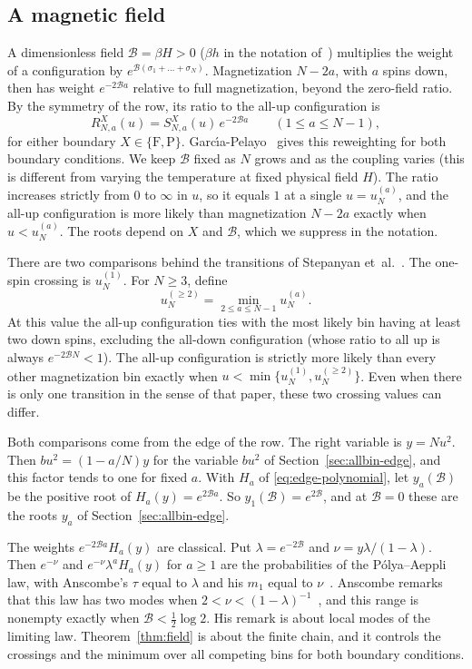 \subsection{A magnetic field}\label{sec:field}

A dimensionless field $\mathcal B=\beta H>0$ ($\beta h$ in the notation
of~\cite{stepanyan2024}) multiplies the weight of a
configuration by $e^{\mathcal B(\sigma_1+\dots+\sigma_N)}$. Magnetization
$N-2a$, with $a$ spins down, then has weight $e^{-2\mathcal Ba}$ relative to
full magnetization, beyond the zero-field ratio. By the symmetry of the row, its
ratio to the all-up configuration is
\[
R^X_{N,a}(u)=S^X_{N,a}(u)\,e^{-2\mathcal Ba}\qquad(1\le a\le N-1),
\]
for either boundary $X\in\{\mathrm F,\mathrm P\}$. Garc\'{\i}a-Pelayo~\cite[Eq.~(17)]{garciapelayo2009}
gives this reweighting for both boundary conditions. We keep $\mathcal B$ fixed
as $N$ grows and as the coupling varies (this is different from varying the
temperature at fixed physical field $H$). The ratio increases strictly from $0$ to $\infty$ in $u$, so
it equals $1$ at a single $u=u^{(a)}_N$, and the all-up configuration is more
likely than magnetization $N-2a$ exactly when $u<u^{(a)}_N$. The roots depend
on $X$ and $\mathcal B$, which we suppress in the notation.

There are two comparisons behind the transitions of Stepanyan
et~al.\@~\cite[Section~III.C]{stepanyan2024}. The one-spin crossing is
$u^{(1)}_N$. For $N\ge3$, define
\[
u^{(\ge2)}_N=\min_{2\le a\le N-1}u^{(a)}_N.
\]
At this value the all-up configuration ties with the most likely bin having
at least two down spins, excluding the all-down configuration (whose ratio
to all up is always $e^{-2\mathcal BN}<1$). The all-up configuration is
strictly more likely than every other magnetization bin exactly when
$u<\min\{u^{(1)}_N,u^{(\ge2)}_N\}$. Even when there is only one transition in the sense of that paper, these two
crossing values can differ.

Both comparisons come from the edge of the row. The right variable is
$y=Nu^2$. Then $bu^2=(1-a/N)y$ for the variable $bu^2$ of
Section~\ref{sec:allbin-edge}, and this factor tends to one for fixed $a$. With $H_a$ of
\eqref{eq:edge-polynomial}, let $y_a(\mathcal B)$ be the positive root of $H_a(y)=e^{2\mathcal Ba}$. So
$y_1(\mathcal B)=e^{2\mathcal B}$, and at $\mathcal B=0$ these are the roots
$y_a$ of Section~\ref{sec:allbin-edge}.

The weights $e^{-2\mathcal Ba}H_a(y)$ are classical. Put $\lambda=e^{-2\mathcal B}$
and $\nu=y\lambda/(1-\lambda)$. Then $e^{-\nu}$ and $e^{-\nu}\lambda^aH_a(y)$ for
$a\ge1$ are the probabilities of the P\'olya--Aeppli law, with Anscombe's $\tau$
equal to $\lambda$ and his $m_1$ equal to $\nu$~\cite[Eqs.~(2.11) to~(2.13),
p.~362]{anscombe1950}. Anscombe remarks that this law has two modes when
$2<\nu<(1-\lambda)^{-1}$~\cite[p.~364]{anscombe1950}, and this range is
nonempty exactly when $\mathcal B<\frac12\log2$. His remark is about local
modes of the limiting law. Theorem~\ref{thm:field} is about the finite
chain, and it controls the crossings and the minimum over all competing
bins for both boundary conditions.

